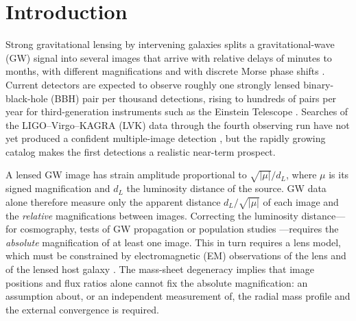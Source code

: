 \section{Introduction}
\label{sec:introduction}
Strong gravitational lensing by intervening galaxies splits a gravitational-wave (GW) signal into several images that arrive with relative delays of minutes to months, with different magnifications and with discrete Morse phase shifts \citep{takahashi2003waveeffects,dai2017morse,ezquiaga2021phase}. Current detectors are expected to observe roughly one strongly lensed binary-black-hole (BBH) pair per thousand detections, rising to hundreds of pairs per year for third-generation instruments such as the Einstein Telescope \citep[ET;][]{ng2018rates,li2018statistical,oguri2018distribution,wierda2021beyond}. Searches of the LIGO--Virgo--KAGRA (LVK) data through the fourth observing run have not yet produced a confident multiple-image detection \citep{hannuksela2019search,lvk2021o3a,lvk2024o3search,lvk2025gwtc4lensing}, but the rapidly growing catalog \citep{lvk2025gwtc4} makes the first detections a realistic near-term prospect.

A lensed GW image has strain amplitude proportional to $\sqrt{|\mu|}/d_L$, where $\mu$ is its signed magnification and $d_L$ the luminosity distance of the source. GW data alone therefore measure only the apparent distance $d_L/\sqrt{|\mu|}$ of each image and the \emph{relative} magnifications between images. Correcting the luminosity distance---for cosmography, tests of GW propagation or population studies \citep{liao2017precision,oguri2019review}---requires the \emph{absolute} magnification of at least one image. This in turn requires a lens model, which must be constrained by electromagnetic (EM) observations of the lens and of the lensed host galaxy \citep{hannuksela2020localizing,wempe2022lensing,smith2023discovering,uronen2026galacticcentres}. The mass-sheet degeneracy \citep{falco1985msd,schneider2013msd} implies that image positions and flux ratios alone cannot fix the absolute magnification: an assumption about, or an independent measurement of, the radial mass profile and the external convergence is required.

